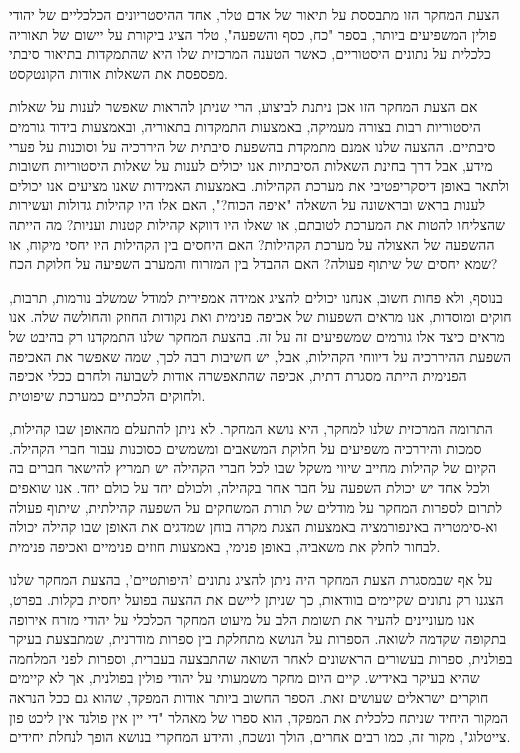 
הצעת המחקר הזו מתבססת על תיאור של אדם טלר, אחד ההיסטריונים הכלכליים של יהודי פולין המשפיעים ביותר, בספר "כח, כסף והשפעה", טלר הציג ביקורת על יישום של תאוריה כלכלית על נתונים היסטוריים, כאשר הטענה המרכזית שלו היא שהתמקדות בתיאור סיבתי מפספסת את השאלות אודות הקונטקסט. 

אם הצעת המחקר הזו אכן ניתנת לביצוע, הרי שניתן להראות שאפשר לענות על שאלות היסטוריות רבות בצורה מעמיקה, באמצעות התמקדות בתאוריה, ובאמצעות בידוד גורמים סיבתיים. ההצעה שלנו אמנם מתמקדת בהשפעת סיבתית של היררכיה על וסוכנות על פערי מידע, אבל דרך בחינת השאלות הסיבתיות אנו יכולים לענות על שאלות היסטוריות חשובות ולתאר באופן דיסקריפטיבי את מערכת הקהילות. באמצעות האמידות שאנו מציעים אנו יכולים לענות בראש ובראשונה על השאלה "איפה הכוח?", האם אלו היו קהילות גדולות ועשירות שהצליחו להטות את המערכת לטובתם, או שאלו היו דווקא קהילות קטנות ועניות? מה הייתה ההשפעה של האצולה על מערכת הקהילות? האם היחסים בין הקהילות היו יחסי מיקוח, או שמא יחסים של שיתוף פעולה? האם ההבדל בין המזרוח והמערב השפיעה על חלוקת הכח?

בנוסף, ולא פחות חשוב, אנחנו יכולים להציג אמידה אמפירית למודל שמשלב נורמות, תרבות, חוקים ומוסדות, אנו מראים השפעות של אכיפה פנימית ואת נקודות החוזק והחולשה שלה. אנו מראים כיצד אלו גורמים שמשפיעים זה על זה. בהצעת המחקר שלנו התמקדנו רק בהיבט של השפעת ההיררכיה על דיווחי הקהילות, אבל, יש חשיבות רבה לכך, שמה שאפשר את האכיפה הפנימית הייתה מסגרת דתית, אכיפה שהתאפשרה אודות לשבועה ולחרם ככלי אכיפה ולחוקים הלכתיים כמערכת שיפוטית.

התרומה המרכזית שלנו למחקר, היא נושא המחקר. לא ניתן להתעלם מהאופן שבו קהילות, סמכות והיררכיה משפיעים על חלוקת המשאבים ומשמשים כסוכנות עבור חברי הקהילה. הקיום של קהילות מחייב שיווי משקל שבו לכל חברי הקהילה יש תמריץ להישאר חברים בה ולכל אחד יש יכולת השפעה על חבר אחר בקהילה, ולכולם יחד על כולם יחד. אנו שואפים לתרום לספרות המחקר על מודלים של תורת המשחקים על השפעה קהילתית, שיתוף פעולה וא-סימטריה באינפורמציה באמצעות הצגת מקרה בוחן שמדגים את האופן שבו קהילה יכולה לבחור לחלק את משאביה, באופן פנימי, באמצעות חוזים פנימיים ואכיפה פנימית.

על אף שבמסגרת הצעת המחקר היה ניתן להציג נתונים 'היפותטיים', בהצעת המחקר שלנו הצגנו רק נתונים שקיימים בוודאות, כך שניתן ליישם את ההצעה בפועל יחסית בקלות. בפרט, אנו מעוניינים להעיר את תשומת הלב על מיעוט המחקר הכלכלי על יהודי מזרח אירופה בתקופה שקדמה לשואה. הספרות על הנושא מתחלקת בין ספרות מודרנית, שמתבצעת בעיקר בפולנית, ספרות בעשורים הראשונים לאחר השואה שהתבצעה בעברית, וספרות לפני המלחמה שהיא בעיקר באידיש. קיים היום מחקר משמעותי על יהודי פולין בפולנית, אך לא קיימים חוקרים ישראלים שעושים זאת. הספר החשוב ביותר אודות המפקד, שהוא גם ככל הנראה המקור היחיד שניתח כלכלית את המפקד, הוא ספרו של מאהלר "די יין אין פולנד אין ליכט פון צייטלוג", מקור זה, כמו רבים אחרים, הולך ונשכח, והידע המחקרי בנושא הופך לנחלת יחידים.

